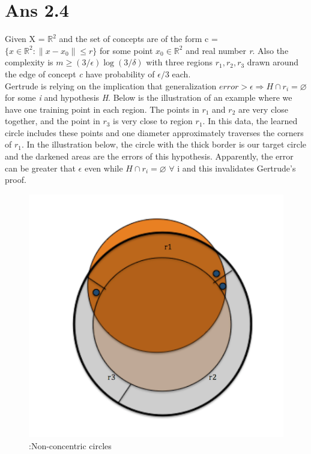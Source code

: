 \documentclass[10pt]{article}
\begin{document}
\section*{Ans 2.4}
\begin{flushleft}
Given X = $\mathbb{R}^{2}$ and the set of concepts are of the form c = $\{x \in \mathbb{R}^{2}: \|x- x_{0}\| \leq r\}$ for some point $x_{0} \in \mathbb{R}^{2}$ and real number \textit{r}. Also the complexity is $m \geq (3/\epsilon) \log(3/\delta)$ with three regions $r_{1}, r_{2}, r_{3}$ drawn around the edge of concept \textit{c} have probability of $\epsilon/3$ each.\\
\vspace{0.5em}
Gertrude is relying on the implication that generalization $error > \epsilon \Rightarrow H \cap r_{i} = \varnothing$ for some \textit{i} and hypothesis \textit{H}. Below is the illustration of an example where we have one training point in each region. The points in $r_{1}$ and $r_{2}$ are very close together, and the point in $r_{3}$ is very close to region $r_{1}$. In this data, the learned circle includes these points and one diameter approximately traverses the corners of $r_{1}$. In the illustration below, the circle with the thick border is our target circle and the darkened areas are the errors of this hypothesis. Apparently, the error can be greater that $\epsilon$ even while $H \cap r_{i} = \varnothing$ $ \forall$ i and this invalidates Gertrude's proof.  
\begin{figure}[!htb]
\includegraphics{Non-CC.png}
\caption{:Non-concentric circles}
\end{figure}
\end{flushleft}
\vspace{10em}
\end{document}
